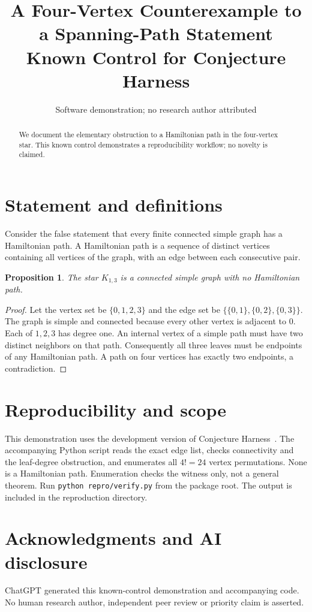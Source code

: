 \documentclass[11pt]{article}
\title{A Four-Vertex Counterexample to a Spanning-Path Statement\\\large Known Control for Conjecture Harness}
\author{Software demonstration; no research author attributed}
\date{}
\newtheorem{proposition}{Proposition}
\begin{document}
\maketitle
\begin{abstract}
We document the elementary obstruction to a Hamiltonian path in the four-vertex star. This known control demonstrates a reproducibility workflow; no novelty is claimed.
\end{abstract}
\section{Statement and definitions}
Consider the false statement that every finite connected simple graph has a Hamiltonian path. A Hamiltonian path is a sequence of distinct vertices containing all vertices of the graph, with an edge between each consecutive pair.
\begin{proposition}
The star $K_{1,3}$ is a connected simple graph with no Hamiltonian path.
\end{proposition}
\begin{proof}
Let the vertex set be $\{0,1,2,3\}$ and the edge set be $\{\{0,1\},\{0,2\},\{0,3\}\}$. The graph is simple and connected because every other vertex is adjacent to $0$. Each of $1,2,3$ has degree one. An internal vertex of a simple path must have two distinct neighbors on that path. Consequently all three leaves must be endpoints of any Hamiltonian path. A path on four vertices has exactly two endpoints, a contradiction.
\end{proof}
\section{Reproducibility and scope}
This demonstration uses the development version of Conjecture Harness~\cite{conjectureharness2026}. The accompanying Python script reads the exact edge list, checks connectivity and the leaf-degree obstruction, and enumerates all $4!=24$ vertex permutations. None is a Hamiltonian path. Enumeration checks the witness only, not a general theorem. Run \texttt{python repro/verify.py} from the package root. The output is included in the reproduction directory.
\section*{Acknowledgments and AI disclosure}
ChatGPT generated this known-control demonstration and accompanying code. No human research author, independent peer review or priority claim is asserted.

\end{document}
